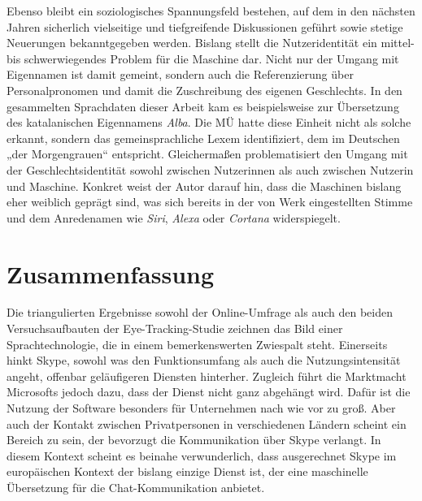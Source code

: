 Ebenso bleibt ein soziologisches Spannungsfeld bestehen, auf dem in den nächsten Jahren sicherlich vielseitige und tiefgreifende Diskussionen geführt sowie stetige Neuerungen bekanntgegeben werden. Bislang stellt die Nutzeridentität ein mittel- bis schwerwiegendes Problem für die Maschine dar. Nicht nur der Umgang mit Eigennamen ist damit gemeint, sondern auch die Referenzierung über Personalpronomen und damit die Zuschreibung des eigenen Geschlechts. In den gesammelten Sprachdaten dieser Arbeit kam es beispielsweise zur Übersetzung des katalanischen Eigennamens \emph{Alba}. Die MÜ hatte diese Einheit nicht als solche erkannt, sondern das gemeinsprachliche Lexem identifiziert, dem im Deutschen „der Morgengrauen“ entspricht. Gleichermaßen problematisiert \citet{roser_warum_2018} den Umgang mit der Geschlechtsidentität sowohl zwischen Nutzer{\textperiodcentered}innen als auch zwischen Nutzer{\textperiodcentered}in und Maschine. Konkret weist der Autor darauf hin, dass die Maschinen bislang eher weiblich geprägt sind, was sich bereits in der von Werk eingestellten Stimme und dem Anredenamen wie \emph{Siri}, \emph{Alexa} oder \emph{Cortana} widerspiegelt.


\section{Zusammenfassung}
\label{K7:sec:zusammenfassung}


Die triangulierten Ergebnisse sowohl der Online-Umfrage als auch den beiden Versuchsaufbauten der Eye-Tracking-Studie zeichnen das Bild einer Sprachtechnologie, die in einem bemerkenswerten Zwiespalt steht. Einerseits hinkt Skype, sowohl was den Funktionsumfang als auch die Nutzungsintensität angeht, offenbar geläufigeren Diensten hinterher. Zugleich führt die Marktmacht Microsofts jedoch dazu, dass der Dienst nicht ganz abgehängt wird. Dafür ist die Nutzung der Software besonders für Unternehmen nach wie vor zu groß. Aber auch der Kontakt zwischen Privatpersonen in verschiedenen Ländern scheint ein Bereich zu sein, der bevorzugt die Kommunikation über Skype verlangt. In diesem Kontext scheint es beinahe verwunderlich, dass ausgerechnet Skype im europäischen Kontext der bislang einzige Dienst ist, der eine maschinelle Übersetzung für die Chat-Kommunikation anbietet.


